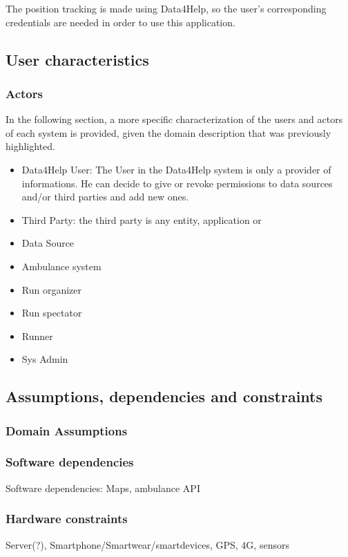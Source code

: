 The position tracking is made using Data4Help, so the user's corresponding credentials are needed in order to use this application.

\subsection{User characteristics}
\subsubsection{Actors}
In the following section, a more specific characterization of the users and actors of each system is provided, given the domain description that was previously highlighted.
\begin{itemize}
\item Data4Help User: The User in the Data4Help system is only a provider of informations. He can decide to give or revoke permissions to data sources and/or third parties and add new ones.
\item Third Party: the third party is any entity, application or 
\item Data Source
\item Ambulance system
\item Run organizer
\item Run spectator
\item Runner
\item Sys Admin
\end{itemize}
\subsection{Assumptions, dependencies and constraints}
\subsubsection{Domain Assumptions}
\subsubsection{Software dependencies}
Software dependencies: Maps, ambulance API
\subsubsection{Hardware constraints}
Server(?), Smartphone/Smartwear/smartdevices, GPS, 4G, sensors